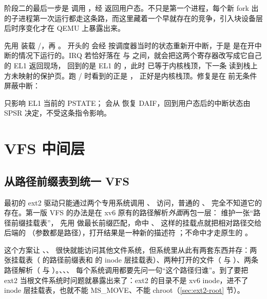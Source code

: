 阶段二的最后一步是  调用 ，经  返回用户态。不只是第一个进程，每个新 fork 出的子进程第一次运行都走这条路，而这里藏着一个早就存在的竞争，引入块设备层后时序变化才在 QEMU 上暴露出来。

 先用  装载 /，再 。 开头的  会经  按调度器当时的状态重新开中断，于是  是在开中断的情况下运行的。IRQ 若恰好落在  与  之间，就会把这两个寄存器改写成它自己的 EL1 返回现场， 回到的是 EL1 的 ，此时  已等于内核栈顶，下一条  读到栈上方未映射的保护页。跑 / 时看到的正是 ， 正好是内核栈顶。修复是在  前无条件屏蔽中断：


\begin{note}
   只影响 EL1 当前的 PSTATE； 会从  恢复 DAIF，回到用户态后的中断状态由 SPSR 决定，不受这条指令影响。
\end{note}

\section{VFS 中间层}
\label{sec:vfs}

\subsection{从路径前缀表到统一 VFS}

最初的 ext2 驱动只能通过两个专用系统调用 、 访问，普通的 、 完全不知道它的存在。第一版 VFS 的办法是在 xv6 原有的路径解析\emph{外面}再包一层： 维护一张“路径前缀挂载表”， 先用  做最长前缀匹配，命中 、 这样的挂载点就把相对路径交给后端的 （参数都是路径），打开结果是一种新的描述符 ；不命中才走原生的 。

这个方案让 、、 很快就能访问其他文件系统，但系统里从此有两套东西并存：两张挂载表（ 的路径前缀表和  的 inode 层挂载表）、两种打开的文件（ 与 ）、两条路径解析（ 与 ）。、、、 每个系统调用都要先问一句“这个路径归谁”。到了要把 ext2 当根文件系统时问题就暴露出来了：ext2 的目录不是 xv6 inode，进不了 inode 层挂载表，也就不能 MS\_MOVE、不能 chroot（\ref{sec:ext2-root} 节）。

